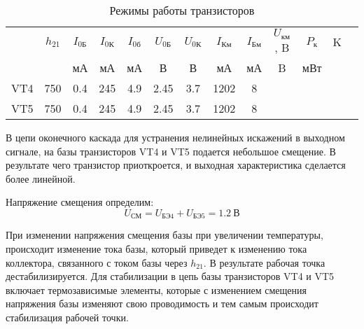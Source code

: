 \begin{table}[htbp]
\caption{Режимы работы транзисторов}
\begin{center}\begin{tabular}{|c|c|c|c|c|c|c|c|c|c|c|c|c|}
\hline 
   & $h_{21}$ & $I_\text{0Б}$ &$I_\text{0К}$ & $I_\text{0б}$& $U_\text{0Б}$ & $U_\text{0К}$&  $I_{\text{Км}}$  & $I_{\text{Бм}}$& $U_{\text{км}}$, B & $P_{\text{к}}$ & K\\ 
  & &мА &мА & мА& В & В & мА & мА & B & мВт & \\
\hline 
VT4 & 750 & 0.4 & 245 & 4.9 & 2.45 & 3.7 & 1202 & 8 &  \\
\hline 
VT5 & 750 & 0.4 & 245 & 4.9 & 2.45 & 3.7 & 1202 & 8 &  \\
\hline
\end{tabular} 
\end{center}
\end{table}

В цепи оконечного каскада для устранения нелинейных искажений в выходном сигнале, на базы транзисторов VT4 и VT5 подается небольшое смещение. В результате чего транзистор приоткроется, и выходная характеристика сделается более линейной. \par
Напряжение смещения определим:
\begin{equation}
\label{eq:equation2_23}
 U_{\text{СМ}} = U_{\text{БЭ4}} + U_{\text{БЭ5}} = 1.2~В                                         
\end{equation}

При изменении напряжения смещения базы при увеличении температуры, происходит изменение тока базы, который приведет к изменению тока коллектора, связанного с током базы через $h_{21}$. В результате рабочая точка дестабилизируется. Для стабилизации в цепь базы транзисторов VT4 и VT5 включает термозависимые элементы, которые с изменением смещения напряжения базы изменяют свою проводимость и тем самым происходит стабилизация рабочей точки.
